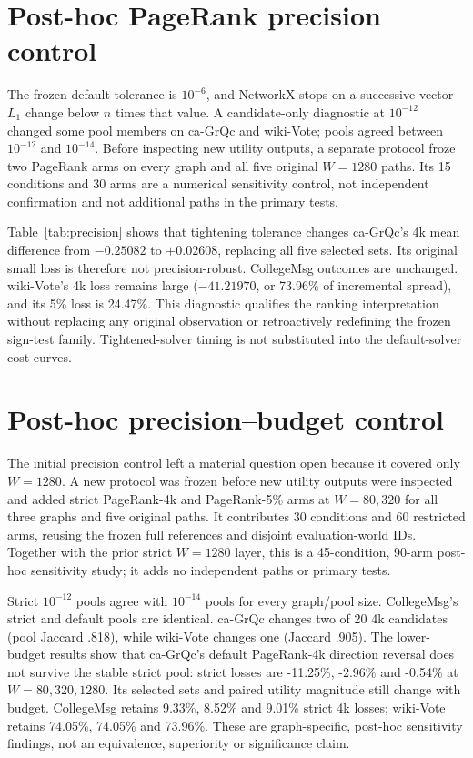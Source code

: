\documentclass[smallextended]{svjour3}
\begin{document}
\section{Post-hoc PageRank precision control}
The frozen default tolerance is $10^{-6}$, and NetworkX stops on a successive
vector $L_1$ change below $n$ times that value. A candidate-only diagnostic at
$10^{-12}$ changed some pool members on ca-GrQc and wiki-Vote; pools agreed
between $10^{-12}$ and $10^{-14}$. Before inspecting new utility outputs, a
separate protocol froze two PageRank arms on every graph and all five original
$W=1280$ paths. Its 15 conditions and 30 arms are a numerical sensitivity control,
not independent confirmation and not additional paths in the primary tests.

Table~\ref{tab:precision} shows that tightening tolerance changes ca-GrQc's 4k
mean difference from $-0.25082$ to $+0.02608$, replacing all five selected sets.
Its original small loss is therefore not precision-robust. CollegeMsg outcomes
are unchanged. wiki-Vote's 4k loss remains large ($-41.21970$, or 73.96\% of
incremental spread), and its 5\% loss is 24.47\%. This diagnostic qualifies the
ranking interpretation without replacing any original observation or retroactively
redefining the frozen sign-test family. Tightened-solver timing is not substituted
into the default-solver cost curves.

\section{Post-hoc precision--budget control}
The initial precision control left a material question open because it covered
only $W=1280$. A new protocol was frozen before new utility outputs were inspected
and added strict PageRank-4k and PageRank-5\% arms at $W=80,320$ for all three
graphs and five original paths. It contributes 30 conditions and 60 restricted
arms, reusing the frozen full references and disjoint evaluation-world IDs. Together
with the prior strict $W=1280$ layer, this is a 45-condition, 90-arm post-hoc
sensitivity study; it adds no independent paths or primary tests.

Strict $10^{-12}$ pools agree with $10^{-14}$ pools for every graph/pool size.
CollegeMsg's strict and default pools are identical. ca-GrQc changes two of 20
4k candidates (pool Jaccard .818), while wiki-Vote changes one (Jaccard .905).
The lower-budget results show that ca-GrQc's default PageRank-4k direction reversal
does not survive the stable strict pool: strict losses are -11.25\%, -2.96\% and
-0.54\% at $W=80,320,1280$. Its selected sets and paired utility magnitude still
change with budget. CollegeMsg retains 9.33\%, 8.52\% and 9.01\% strict 4k losses;
wiki-Vote retains 74.05\%, 74.05\% and 73.96\%. These are graph-specific,
post-hoc sensitivity findings, not an equivalence, superiority or significance claim.

\end{document}
